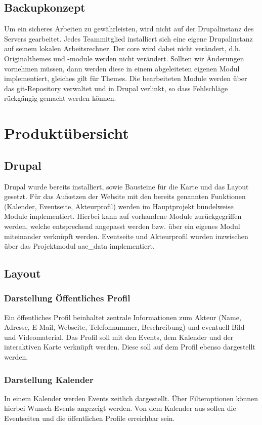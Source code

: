 \documentclass{swp}
\begin{document}
\subsection{Backupkonzept}
Um ein sicheres Arbeiten zu gew\"ahrleisten, wird nicht auf der Drupalinstanz des Servers gearbeitet. Jedes Teammitglied installiert sich eine eigene Drupalinstanz auf seinem lokalen Arbeitsrechner. Der \glqq core\grqq{} wird dabei nicht ver\"andert, d.h. Originalthemes und -module werden nicht ver\"andert. Sollten wir \"Anderungen vornehmen m\"ussen, dann werden diese in einem abgeleiteten eigenen Modul implementiert, gleiches gilt f\"ur Themes. Die bearbeiteten Module werden \"uber das git-Repository verwaltet und in Drupal verlinkt, so dass Fehlschl\"age r\"uckg\"angig gemacht werden k\"onnen.
\section{Produkt\"ubersicht}
\subsection{Drupal}
Drupal wurde bereits installiert, sowie Bausteine f\"ur die Karte und das Layout gesetzt. F\"ur das Aufsetzen der Website mit den bereits genannten Funktionen (Kalender, Eventseite, Akteurprofil) werden im Hauptprojekt b\"undelweise Module implementiert. Hierbei kann auf vorhandene Module zur\"uckgegriffen werden, welche entsprechend angepasst werden bzw. \"uber ein eigenes Modul miteinander verkn\"upft werden.  Eventseite und Akteurprofil wurden inzwischen \"uber das Projektmodul aae\_{}data implementiert. 
\subsection{Layout}
\subsubsection{Darstellung \"Offentliches Profil}
Ein \"offentliches Profil beinhaltet zentrale Informationen zum Akteur (Name, Adresse, E-Mail, Webseite, Telefonnummer, Beschreibung) und eventuell Bild- und Videomaterial. Das Profil soll mit den Events, dem Kalender und der interaktiven Karte verkn\"upft werden. Diese soll auf dem Profil ebenso dargestellt werden.
\subsubsection{Darstellung Kalender}
In einem Kalender werden Events zeitlich dargestellt. \"Uber Filteroptionen k\"onnen hierbei \glqq Wunsch-Events\grqq{} angezeigt werden. Von dem Kalender aus sollen die Eventseiten und die \"offentlichen Profile erreichbar sein.
\end{document}
